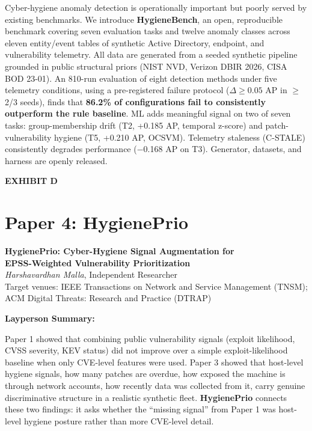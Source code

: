 \documentclass[12pt,letterpaper]{article}
\newenvironment{exhibitbox}{%
  \begin{mdframed}[backgroundcolor=lightblue,linecolor=headblue,linewidth=1.5pt,
                   topline=true,bottomline=true,leftline=true,rightline=true,
                   innertopmargin=12pt,innerbottommargin=12pt,
                   innerleftmargin=14pt,innerrightmargin=14pt]
}{%
  \end{mdframed}
}
\newcommand{\exhibitlabel}[1]{%
  \begin{center}
    \large\bfseries\textcolor{headblue}{#1}
  \end{center}
}
\begin{document}
\begin{exhibitbox}
Cyber-hygiene anomaly detection is operationally important but poorly served by
existing benchmarks. We introduce \textbf{HygieneBench}, an open, reproducible
benchmark covering seven evaluation tasks and twelve anomaly classes across
eleven entity/event tables of synthetic Active Directory, endpoint, and
vulnerability telemetry. All data are generated from a seeded synthetic pipeline
grounded in public structural priors (NIST NVD, Verizon DBIR 2026, CISA BOD 23-01).
An 810-run evaluation of eight detection methods under five telemetry conditions,
using a pre-registered failure protocol ($\Delta \geq 0.05$ AP in $\geq$2/3 seeds),
finds that \textbf{86.2\% of configurations fail to consistently outperform the
rule baseline}. ML adds meaningful signal on two of seven tasks: group-membership
drift (T2, +0.185 AP, temporal z-score) and patch-vulnerability hygiene
(T5, +0.210 AP, OCSVM). Telemetry staleness (C-STALE) consistently degrades
performance ($-$0.168 AP on T3). Generator, datasets, and harness are openly
released.
\end{exhibitbox}

\newpage

\exhibitlabel{EXHIBIT D}
\section{Paper 4: HygienePrio}

\begin{center}
  \textbf{\large HygienePrio: Cyber-Hygiene Signal Augmentation for\\
  EPSS-Weighted Vulnerability Prioritization}\\[0.5em]
  \textit{Harshavardhan Malla}, Independent Researcher\\[0.5em]
  Target venues: IEEE Transactions on Network and Service Management (TNSM);
  ACM Digital Threats: Research and Practice (DTRAP)
\end{center}

\vspace{1em}
\noindent\textbf{Layperson Summary:}

Paper 1 showed that combining public vulnerability signals (exploit likelihood,
CVSS severity, KEV status) did not improve over a simple exploit-likelihood
baseline when only CVE-level features were used. Paper 3 showed that host-level
hygiene signals, how many patches are overdue, how exposed the machine is
through network accounts, how recently data was collected from it, carry
genuine discriminative structure in a realistic synthetic fleet. \textbf{HygienePrio}
connects these two findings: it asks whether the ``missing signal'' from Paper 1
was host-level hygiene posture rather than more CVE-level detail.
\end{document}

